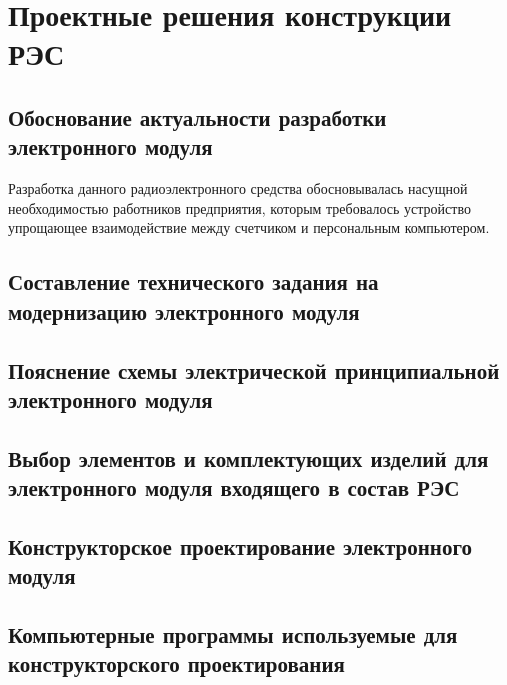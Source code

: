 \section{Проектные решения конструкции РЭС}

\subsection{Обоснование актуальности разработки электронного модуля}

Разработка данного радиоэлектронного средства обосновывалась
насущной необходимостью работников предприятия,
которым требовалось устройство упрощающее взаимодействие
между счетчиком и персональным компьютером.



\subsection{Составление технического задания на модернизацию электронного модуля}

\subsection{Пояснение схемы электрической принципиальной электронного модуля}

\subsection{Выбор элементов и комплектующих изделий для электронного модуля входящего в состав РЭС}

\subsection{Конструкторское проектирование электронного модуля}

\subsection{Компьютерные программы используемые для конструкторского проектирования}

\newpage
